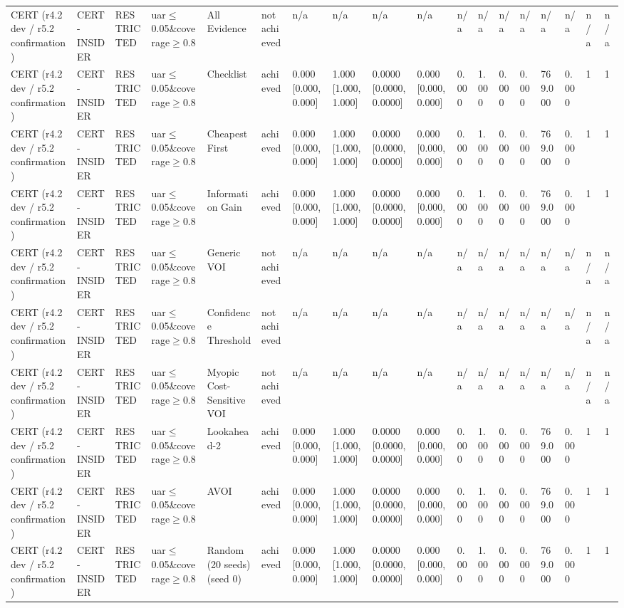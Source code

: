 \begin{table}[!ht]
{\begin{tabular}{llllllllllllllllll}
CERT (r4.2 dev / r5.2 confirmation) & CERT-INSIDER & RESTRICTED & uar$\le$0.05\&coverage$\ge$0.8 & All Evidence & not achieved & n/a & n/a & n/a & n/a & n/a & n/a & n/a & n/a & n/a & n/a & n/a & n/a \\
CERT (r4.2 dev / r5.2 confirmation) & CERT-INSIDER & RESTRICTED & uar$\le$0.05\&coverage$\ge$0.8 & Checklist & achieved & 0.000 [0.000, 0.000] & 1.000 [1.000, 1.000] & 0.0000 [0.0000, 0.0000] & 0.000 [0.000, 0.000] & 0.000 & 1.000 & 0.000 & 0.000 & 769.000 & 0.000 & 1 & 1 \\
CERT (r4.2 dev / r5.2 confirmation) & CERT-INSIDER & RESTRICTED & uar$\le$0.05\&coverage$\ge$0.8 & Cheapest First & achieved & 0.000 [0.000, 0.000] & 1.000 [1.000, 1.000] & 0.0000 [0.0000, 0.0000] & 0.000 [0.000, 0.000] & 0.000 & 1.000 & 0.000 & 0.000 & 769.000 & 0.000 & 1 & 1 \\
CERT (r4.2 dev / r5.2 confirmation) & CERT-INSIDER & RESTRICTED & uar$\le$0.05\&coverage$\ge$0.8 & Information Gain & achieved & 0.000 [0.000, 0.000] & 1.000 [1.000, 1.000] & 0.0000 [0.0000, 0.0000] & 0.000 [0.000, 0.000] & 0.000 & 1.000 & 0.000 & 0.000 & 769.000 & 0.000 & 1 & 1 \\
CERT (r4.2 dev / r5.2 confirmation) & CERT-INSIDER & RESTRICTED & uar$\le$0.05\&coverage$\ge$0.8 & Generic VOI & not achieved & n/a & n/a & n/a & n/a & n/a & n/a & n/a & n/a & n/a & n/a & n/a & n/a \\
CERT (r4.2 dev / r5.2 confirmation) & CERT-INSIDER & RESTRICTED & uar$\le$0.05\&coverage$\ge$0.8 & Confidence Threshold & not achieved & n/a & n/a & n/a & n/a & n/a & n/a & n/a & n/a & n/a & n/a & n/a & n/a \\
CERT (r4.2 dev / r5.2 confirmation) & CERT-INSIDER & RESTRICTED & uar$\le$0.05\&coverage$\ge$0.8 & Myopic Cost-Sensitive VOI & not achieved & n/a & n/a & n/a & n/a & n/a & n/a & n/a & n/a & n/a & n/a & n/a & n/a \\
CERT (r4.2 dev / r5.2 confirmation) & CERT-INSIDER & RESTRICTED & uar$\le$0.05\&coverage$\ge$0.8 & Lookahead-2 & achieved & 0.000 [0.000, 0.000] & 1.000 [1.000, 1.000] & 0.0000 [0.0000, 0.0000] & 0.000 [0.000, 0.000] & 0.000 & 1.000 & 0.000 & 0.000 & 769.000 & 0.000 & 1 & 1 \\
CERT (r4.2 dev / r5.2 confirmation) & CERT-INSIDER & RESTRICTED & uar$\le$0.05\&coverage$\ge$0.8 & AVOI & achieved & 0.000 [0.000, 0.000] & 1.000 [1.000, 1.000] & 0.0000 [0.0000, 0.0000] & 0.000 [0.000, 0.000] & 0.000 & 1.000 & 0.000 & 0.000 & 769.000 & 0.000 & 1 & 1 \\
CERT (r4.2 dev / r5.2 confirmation) & CERT-INSIDER & RESTRICTED & uar$\le$0.05\&coverage$\ge$0.8 & Random (20 seeds) (seed 0) & achieved & 0.000 [0.000, 0.000] & 1.000 [1.000, 1.000] & 0.0000 [0.0000, 0.0000] & 0.000 [0.000, 0.000] & 0.000 & 1.000 & 0.000 & 0.000 & 769.000 & 0.000 & 1 & 1 \\

\end{tabular}}
\end{table}
